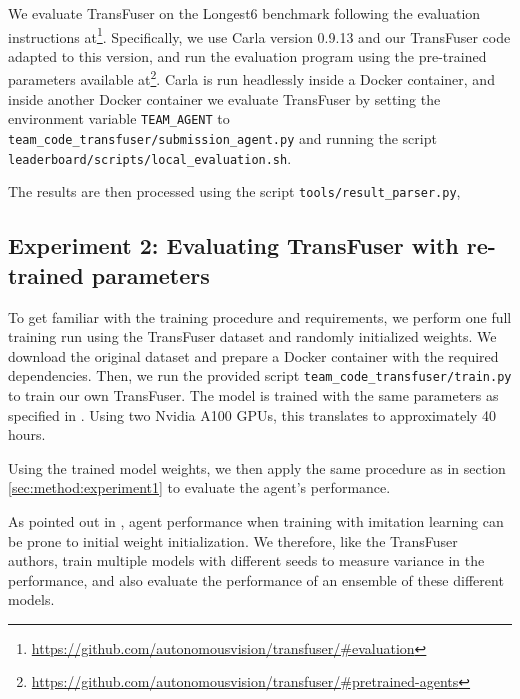 We evaluate TransFuser on the Longest6 benchmark following the evaluation instructions at\footnote{
\url{https://github.com/autonomousvision/transfuser/\#evaluation}}.
Specifically,
we use Carla version 0.9.13 and our TransFuser code adapted to this version,
and run the evaluation program using the pre-trained parameters available at\footnote{
\url{https://github.com/autonomousvision/transfuser/\#pretrained-agents}}.
Carla is run headlessly inside a Docker container,
and inside another Docker container we evaluate TransFuser
by setting the environment variable \texttt{TEAM\_AGENT} to \texttt{team\_code\_transfuser/submission\_agent.py}
and running the script \texttt{leaderboard/scripts/local\_evaluation.sh}.

The results are then processed using the script \texttt{tools/result\_parser.py},


\subsection{Experiment 2: Evaluating TransFuser with re-trained parameters}

To get familiar with the training procedure and requirements,
we perform one full training run using the TransFuser dataset and randomly initialized weights.
We download the original dataset and prepare a Docker container with the required dependencies.
Then, we run the provided script \texttt{team\_code\_transfuser/train.py} to train our own TransFuser.
The model is trained with the same parameters as specified in \cite{transfuser-pami}.
Using two Nvidia A100 GPUs, this translates to approximately 40 hours.

Using the trained model weights,
we then apply the same procedure as in section \ref{sec:method:experiment1}
to evaluate the agent's performance.

As pointed out in \cite{transfuser-pami},
agent performance when training with imitation learning
can be prone to initial weight initialization.
We therefore, like the TransFuser authors,
train multiple models with different seeds to measure variance in the performance,
and also evaluate the performance of an ensemble of these different models.
